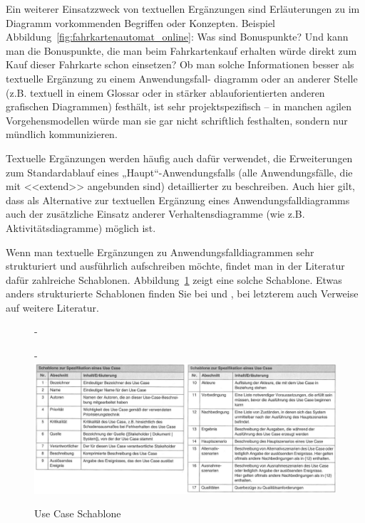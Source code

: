 Ein weiterer Einsatzzweck von textuellen Ergänzungen sind Erläuterungen zu im Diagramm vorkommenden Begriffen oder Konzepten. Beispiel Abbildung~\ref{fig:fahrkartenautomat_online}: Was sind Bonuspunkte? Und kann man die Bonuspunkte, die man beim Fahrkartenkauf erhalten würde direkt zum Kauf dieser Fahrkarte schon einsetzen? Ob man solche \mbox{Informationen} besser als textuelle Ergänzung zu einem Anwendungsfall-
\linebreak %
diagramm oder an anderer Stelle (z.B. textuell in einem Glossar oder in stärker ablauf\-orientierten anderen grafischen Diagrammen) festhält, ist sehr projektspezifisch -- in manchen agilen Vorgehensmodellen würde man sie gar nicht schriftlich festhalten, sondern nur mündlich kommunizieren.

Textuelle Ergänzungen werden häufig auch dafür verwendet, die Erweiterungen zum Standardablauf eines „Haupt“-Anwendungsfalls (alle Anwendungsfälle, die mit \mbox{<<extend>>} angebunden sind) detaillierter zu beschreiben. Auch hier gilt, dass als \mbox{Alternative} zur textuellen Ergänzung eines Anwendungsfalldiagramms auch der zusätzliche Einsatz anderer Verhaltensdiagramme (wie z.B. Aktivitätsdiagramme) 
\linebreak %
möglich ist.

Wenn man textuelle Ergänzungen zu Anwendungsfalldiagrammen sehr strukturiert und ausführlich aufschreiben möchte, findet man in der Literatur dafür zahlreiche Schablonen. Abbildung~\ref{fig:use_case_schablone} zeigt eine solche Schablone. Etwas anders strukturierte Schablonen finden Sie bei \cite[S. 172 und S. 193]{rup14} und \cite[98 \psq]{ber18}, bei letzterem auch Verweise auf weitere Literatur.

\vspace{\baselineskip} %

\begin{figure}[h!]
	\begin{addmargin*}[0cm]{-\marginparwidth}
	\begin{addmargin*}[0cm]{-\marginparsep}
		\centering
		\includegraphics[scale=0.88]{Bilder/Kapitel-6/use_case_schablone.png}
		\caption[Use Case Schablone]{Use Case Schablone \cite[72 \psq]{poh15}}
		\label{fig:use_case_schablone}
	\end{addmargin*}
	\end{addmargin*}
\end{figure}

